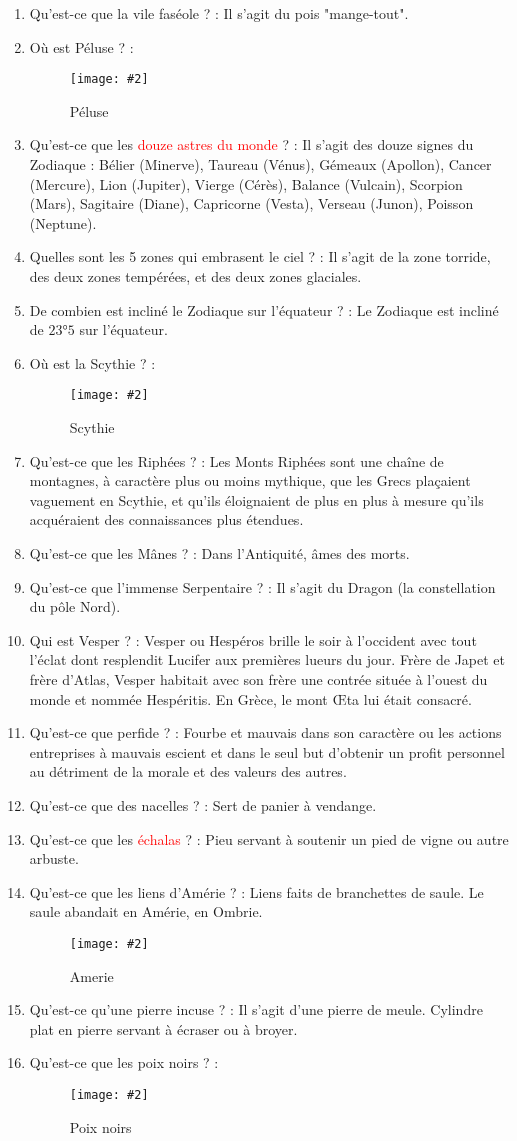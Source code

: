 \documentclass[a4paper, 11pt, hidelinks]{article}
\newcommand{\img}[4]{\begin{figure}[!ht]
    \centering
    \texttt{[image: \#2]}
    \caption{#3}
    \label{#4}
    \end{figure} }
\begin{document}
\begin{enumerate}
      \item Qu'est-ce que la vile faséole ? : Il s'agit du pois "mange-tout".
      \item Où est Péluse ? : \img{0.3}{Péluse.png}{Péluse}{35}
      \item Qu'est-ce que les \textcolor{red}{douze astres du monde} ? : Il s'agit des douze signes du Zodiaque : Bélier (Minerve), Taureau (Vénus), Gémeaux (Apollon),
            Cancer (Mercure), Lion (Jupiter), Vierge (Cérès), Balance (Vulcain), Scorpion (Mars), Sagitaire (Diane), Capricorne (Vesta), Verseau (Junon), Poisson (Neptune).
      \item Quelles sont les 5 zones qui embrasent le ciel ? : Il s'agit de la zone torride, des deux zones tempérées, et des deux zones glaciales.
      \item De combien est incliné le Zodiaque sur l'équateur ? : Le Zodiaque est incliné de $23$°$5$ sur l'équateur.
      \item Où est la Scythie ? :
            \img{0.5}{Scythie.png}{Scythie}{36}
      \item Qu'est-ce que les Riphées ? : Les Monts Riphées sont une chaîne de montagnes, à caractère plus ou moins mythique,
            que les Grecs plaçaient vaguement en Scythie, et qu’ils éloignaient de plus en plus à mesure qu’ils acquéraient des
            connaissances plus étendues.
      \item Qu'est-ce que les Mânes ? : Dans l'Antiquité, âmes des morts.
      \item Qu'est-ce que l'immense Serpentaire ? : Il s'agit du Dragon (la constellation du pôle Nord).
      \item Qui est Vesper ? : Vesper ou Hespéros brille le soir à l'occident avec tout l'éclat dont resplendit Lucifer aux
            premières lueurs du jour. Frère de Japet et frère d'Atlas, Vesper habitait avec son frère une contrée située à l'ouest
            du monde et nommée Hespéritis. En Grèce, le mont Œta lui était consacré.
      \item Qu'est-ce que perfide ? : Fourbe et mauvais dans son caractère ou les actions entreprises à mauvais escient et
            dans le seul but d’obtenir un profit personnel au détriment de la morale et des valeurs des autres.
      \item Qu'est-ce que des nacelles ? : Sert de panier à vendange.
      \item Qu'est-ce que les \textcolor{red}{échalas} ? : Pieu servant à soutenir un pied de vigne ou autre arbuste.
      \item Qu'est-ce que les liens d'Amérie ? : Liens faits de branchettes de saule. Le saule abandait en Amérie, en Ombrie.
            \img{0.4}{Amerie.png}{Amerie}{37}
      \item Qu'est-ce qu'une pierre incuse ? : Il s'agit d'une pierre de meule. Cylindre plat en pierre servant à écraser ou à broyer.
      \item Qu'est-ce que les poix noirs ? : \img{0.5}{poix noirs.jpg}{Poix noirs}{38}
\end{enumerate}
\end{document}
